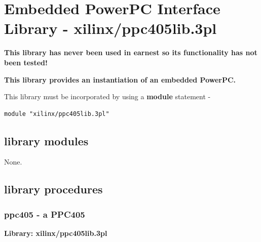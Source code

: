 \pagebreak

\section{Embedded PowerPC Interface Library - xilinx/ppc405lib.3pl}
\label{chap:lmppc405lib}

    {\bf This library has never been used in earnest so its functionality has not
    been tested!}

    {\bf This library provides an instantiation of an embedded PowerPC.}
    
    This library must be incorporated by using a {\bf module} statement -
    \begin{lstlisting}[gobble=4, language=threepl]
       module "xilinx/ppc405lib.3pl"
    \end{lstlisting}




    \subsection{library modules}
    
    None.



    \subsection{library procedures}

         \subsubsection{ppc405 - a PPC405}\label{sec:lpppc405}

            {\bf Library: xilinx/ppc405lib.3pl}

